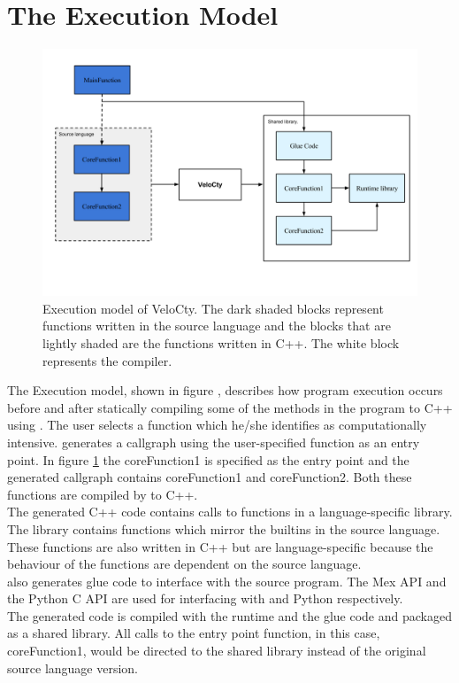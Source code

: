 \section{The Execution Model} 
\label{sec:execModel}
\begin{figure}[htbp]
\begin{center}
\includegraphics[scale=0.4]{Figures/WorkingDetails.png}
\caption[Execution Model]{Execution model of VeloCty. The dark shaded blocks represent functions written in the source language and the blocks that are lightly shaded are the functions written in C++. The white block represents the \velocty compiler.}\label{Fig:working}
\end{center}
\end{figure}
The Execution model, shown in figure , describes how program execution occurs before and after statically compiling some of the methods in the program to C++ using \velocty. The user selects a function which he/she identifies as computationally intensive. \velocty generates a callgraph using the user-specified function as an entry point. In figure \ref{Fig:working} the coreFunction1 is specified as the entry point and the  generated callgraph contains coreFunction1 and coreFunction2. Both these functions are compiled by \velocty to C++.\\
The generated C++ code contains calls to functions in a language-specific library. The library contains functions which mirror the builtins in the source language. These functions are also written in C++ but are language-specific because the behaviour of the functions are dependent on the source language.\\
\velocty also generates glue code to interface with the source program. The Mex API and the Python C API are used for interfacing with \matlab and Python respectively.\\
The generated code is compiled with the runtime and the glue code and packaged as a shared library. All calls to the entry point function, in this case, coreFunction1, would be directed to the shared library instead of the original source language version.\\
